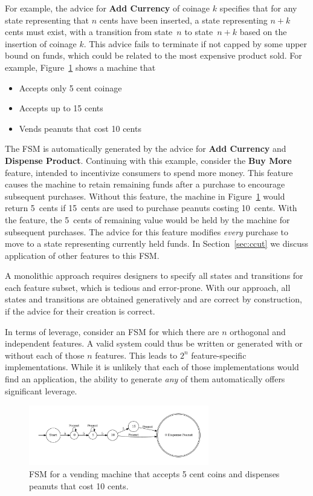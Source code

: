 \documentclass[sigplan,anonymous, review]{acmart}
\begin{document}
For example, the advice for \textbf{Add Currency} of coinage $k$ specifies that for any state representing that $n$ cents have been inserted, a state representing $n+k$ cents must exist, with a transition from state~$n$ to state~$n+k$ based on the insertion of coinage $k$.   This advice fails to terminate if not capped by some upper bound on funds, which could be related to the most expensive product sold. For example, Figure~\ref{fig:vend1} shows a machine that
\begin{itemize}
    \item Accepts only 5 cent coinage
    \item Accepts up to 15 cents
    \item Vends peanuts that cost 10 cents
\end{itemize}
The FSM is automatically generated by the advice for \textbf{Add Currency} and \textbf{Dispense Product}.  Continuing with this example, consider the \textbf{Buy More} feature, intended to incentivize consumers to spend more money.  This feature causes the machine to retain remaining funds after a purchase to encourage subsequent purchases.  Without this feature, the machine in Figure~\ref{fig:vend1} would return 5~cents if 15~cents are used to purchase peanuts costing 10~cents.  With the feature, the 5~cents of remaining value would be held by the machine for subsequent purchases.  The advice for this feature modifies \emph{every} purchase to move to a state representing currently held funds.  In Section~\ref{sec:ccut} we discuss application of other features to this FSM.

A monolithic approach requires designers to specify all states and transitions for each feature subset, which is tedious and error-prone. With our approach, all states and transitions are obtained generatively and are correct by construction, if the advice for their creation is correct.

In terms of leverage, consider an FSM for which there are $n$ orthogonal and independent features.  A valid system could thus be written or generated with or without each of those $n$ features.  This leads to $2^{n}$ feature-specific implementations.  While it is unlikely that each of those implementations would find an application, the ability to generate \emph{any} of them automatically offers significant leverage.

\begin{figure}
    \centering
    \includegraphics[width=0.7\textwidth]{figures/vend1.pdf}
    \caption{FSM for a vending machine that accepts 5 cent coins and dispenses peanuts that cost 10 cents.}
    \label{fig:vend1}
\end{figure}
\end{document}
